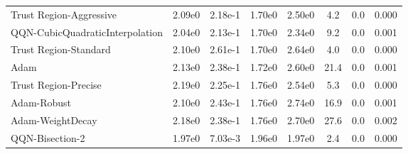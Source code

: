 \documentclass{article}
\begin{document}
\begin{table}[htbp]
{\begin{tabular}{p{2.5cm}*{7}{c}}
Trust Region-Aggressive & 2.09e0 & 2.18e-1 & 1.70e0 & 2.50e0 & 4.2 & 0.0 & 0.000 \\
QQN-CubicQuadraticInterpolation & 2.04e0 & 2.13e-1 & 1.70e0 & 2.34e0 & 9.2 & 0.0 & 0.001 \\
Trust Region-Standard & 2.10e0 & 2.61e-1 & 1.70e0 & 2.64e0 & 4.0 & 0.0 & 0.000 \\
Adam & 2.13e0 & 2.38e-1 & 1.72e0 & 2.60e0 & 21.4 & 0.0 & 0.001 \\
Trust Region-Precise & 2.19e0 & 2.25e-1 & 1.76e0 & 2.54e0 & 5.3 & 0.0 & 0.000 \\
Adam-Robust & 2.10e0 & 2.43e-1 & 1.76e0 & 2.74e0 & 16.9 & 0.0 & 0.001 \\
Adam-WeightDecay & 2.18e0 & 2.38e-1 & 1.76e0 & 2.70e0 & 27.6 & 0.0 & 0.002 \\
QQN-Bisection-2 & 1.97e0 & 7.03e-3 & 1.96e0 & 1.97e0 & 2.4 & 0.0 & 0.000 \\
\bottomrule
\end{tabular}
}
\end{table}
\end{document}
